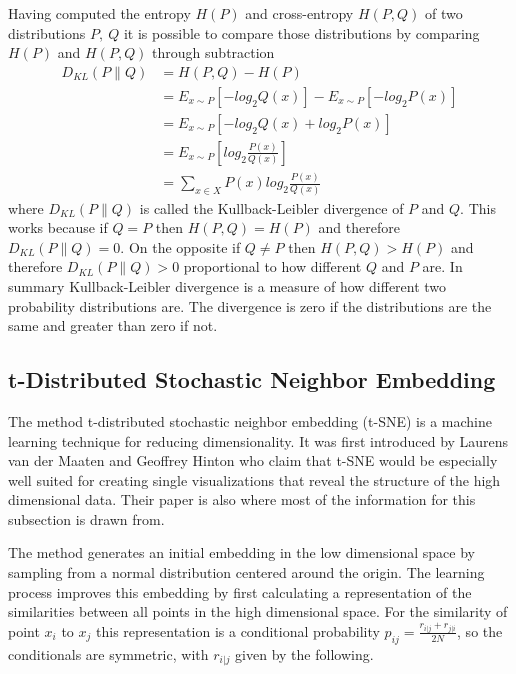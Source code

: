 Having computed the entropy $H(P)$ and cross-entropy $H(P,Q)$ of two distributions $P,\ Q$ it is 
possible to compare those distributions by comparing $H(P)$ and $H(P,Q)$ through subtraction
\begin{equation} \label{eq1}
    \begin{split}
        D_{KL}(P\parallel Q)    & = H(P,Q)-H(P) \\
                                & = E_{x\sim P}[-log_{2}Q(x)]-E_{x\sim P}[-log_{2}P(x)]\\
                                & = E_{x\sim P}[-log_{2}Q(x)+log_{2}P(x)]\\
                                & = E_{x\sim P}[log_{2}\frac{P(x)}{Q(x)}]\\
                                & = \sum_{x\in X} P(x)log_{2}\frac{P(x)}{Q(x)}
    \end{split}
\end{equation}
where $D_{KL}(P\parallel Q)$ is called the Kullback-Leibler divergence of $P$ and $Q$. This works
because if $Q=P$ then $H(P,Q)=H(P)$ and therefore $D_{KL}(P\parallel Q) = 0$.
On the opposite if $Q\neq P$ then $H(P,Q)> H(P)$ and therefore 
$D_{KL}(P\parallel Q) > 0$ proportional to how different $Q$ and $P$ are.
In summary Kullback-Leibler divergence is a measure of how different two probability distributions
are. The divergence is zero if the distributions are the same and greater than zero if not.



\subsection{t-Distributed Stochastic Neighbor Embedding} \label{t-sne}

The method t-distributed stochastic neighbor embedding (t-SNE) is a machine learning technique for reducing
dimensionality. It was first 
introduced by Laurens van der Maaten and Geoffrey Hinton \parencite{2008-vanDerMaaten-visualizing} who
claim that t-SNE would be especially well suited for creating single visualizations that reveal the 
structure of the high dimensional data. Their paper is also where most of the information for this 
subsection is drawn from.

The method generates an initial embedding in the low dimensional space by sampling from a normal distribution 
centered around the origin. The learning process improves this embedding by first calculating a 
representation of the similarities between all points in the high dimensional space. For the similarity of point
$x_{i}$ to $x_{j}$ this representation is a conditional probability $p_{ij}=\frac{r_{i|j} + r_{j|i}}{2N}$,
so the conditionals are symmetric, with 
$r_{i|j}$ given by the following.

